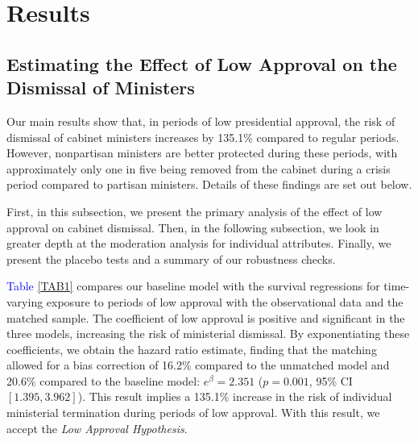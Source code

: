 \documentclass[12pt,halfline,a4paper]{ouparticle}
\begin{document}
\section{Results}
\label{sec4}

\subsection{Estimating the Effect of Low Approval on the Dismissal of Ministers}
\label{sec4.1}

Our main results show that, in periods of low presidential approval, the risk of dismissal of cabinet ministers increases by 135.1\% compared to regular periods. However, nonpartisan ministers are better protected during these periods, with approximately only one in five being removed from the cabinet during a crisis period compared to partisan ministers. Details of these findings are set out below. 

First, in this subsection, we present the primary analysis of the effect of low approval on cabinet dismissal. Then, in the following subsection, we look in greater depth at the moderation analysis for individual attributes. Finally, we present the placebo tests and a summary of our robustness checks.

\textcolor{blue}{Table} \ref{TAB1} compares our baseline model with the survival regressions for time-varying exposure to periods of low approval with the observational data and the matched sample. The coefficient of low approval is positive and significant in the three models, increasing the risk of ministerial dismissal. By exponentiating these coefficients, we obtain the hazard ratio estimate, finding that the matching allowed for a bias correction of 16.2\% compared to the unmatched model and 20.6\% compared to the baseline model: $e^{\beta} = 2.351$ ($p = 0.001$, 95\% CI $[1.395, 3.962]$). This result implies a 135.1\% increase in the risk of individual ministerial termination during periods of low approval. With this result, we accept the {\itshape Low Approval Hypothesis}.
\end{document}
